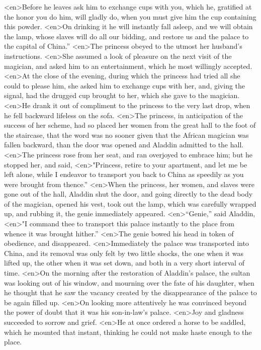 <en>Before he leaves ask him to exchange cups with you, which he, gratified at the honor you do him, will gladly do, when you must give him the cup containing this powder.
<en>On drinking it he will instantly fall asleep, and we will obtain the lamp, whose slaves will do all our bidding, and restore us and the palace to the capital of China.”
<en>The princess obeyed to the utmost her husband’s instructions.
<en>She assumed a look of pleasure on the next visit of the magician, and asked him to an entertainment, which he most willingly accepted.
<en>At the close of the evening, during which the princess had tried all she could to please him, she asked him to exchange cups with her, and, giving the signal, had the drugged cup brought to her, which she gave to the magician.
<en>He drank it out of compliment to the princess to the very last drop, when he fell backward lifeless on the sofa.
<en>The princess, in anticipation of the success of her scheme, had so placed her women from the great hall to the foot of the staircase, that the word was no sooner given that the African magician was fallen backward, than the door was opened and Aladdin admitted to the hall.
<en>The princess rose from her seat, and ran overjoyed to embrace him; but he stopped her, and said,
<en>"Princess, retire to your apartment, and let me be left alone, while I endeavor to transport you back to China as speedily as you were brought from thence.”
<en>When the princess, her women, and slaves were gone out of the hall, Aladdin shut the door, and going directly to the dead body of the magician, opened his vest, took out the lamp, which was carefully wrapped up, and rubbing it, the genie immediately appeared.
<en>“Genie,” said Aladdin,
<en>"I command thee to transport this palace instantly to the place from whence it was brought hither.”
<en>The genie bowed his head in token of obedience, and disappeared.
<en>Immediately the palace was transported into China, and its removal was only felt by two little shocks, the one when it was lifted up, the other when it was set down, and both in a very short interval of time.
<en>On the morning after the restoration of Aladdin’s palace, the sultan was looking out of his window, and mourning over the fate of his daughter, when he thought that he saw the vacancy created by the disappearance of the palace to be again filled up.
<en>On looking more attentively he was convinced beyond the power of doubt that it was his son-in-law’s palace.
<en>Joy and gladness succeeded to sorrow and grief.
<en>He at once ordered a horse to be saddled, which he mounted that instant, thinking he could not make haste enough to the place.
